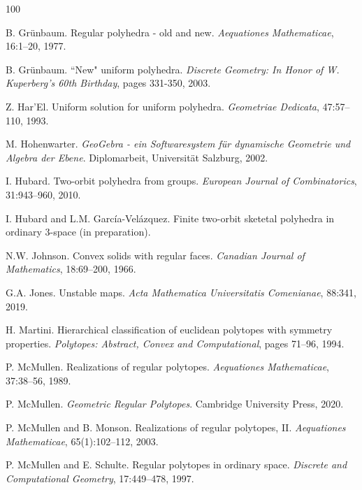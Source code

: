 \documentclass[12pt]{article}
\theoremstyle{definition}\newtheorem{definition}{Definition}[section]
\begin{document}
\begin{thebibliography}{100}

    B. Grünbaum. Regular polyhedra - old and new. \textit{Aequationes Mathematicae}, 16:1–20, 1977.

    
    B. Grünbaum. ``New" uniform polyhedra. \textit{Discrete Geometry: In Honor of W. Kuperberg's 60th Birthday}, pages 331-350, 2003.

    Z. Har’El. Uniform solution for uniform polyhedra. \textit{Geometriae Dedicata}, 47:57–110, 1993.

    M. Hohenwarter. \textit{GeoGebra - ein Softwaresystem für dynamische Geometrie und Algebra der Ebene}. Diplomarbeit, Universität Salzburg, 2002.

    I. Hubard. Two-orbit polyhedra from groups. \textit{ European Journal of Combinatorics}, 31:943--960, 2010.

    I. Hubard and L.M. García-Velázquez. Finite two-orbit sketetal polyhedra in ordinary 3-space (in preparation).

    N.W. Johnson. Convex solids with regular faces. \textit{Canadian Journal of Mathematics}, 18:69–200, 1966.

    G.A. Jones. Unstable maps. \textit{Acta Mathematica Universitatis Comenianae}, 88:341, 2019.

    H. Martini. Hierarchical classification of euclidean polytopes with symmetry properties. \textit{Polytopes: Abstract, Convex and Computational}, pages 71–96, 1994.

    P. McMullen. Realizations of regular polytopes. \textit{Aequationes Mathematicae}, 37:38–56, 1989.

    P. McMullen. \textit{Geometric Regular Polytopes}. Cambridge University Press, 2020.

    P. McMullen and B. Monson. Realizations of regular polytopes, II. \textit{Aequationes Mathematicae}, 65(1):102–112, 2003.

    P. McMullen and E. Schulte. Regular polytopes in ordinary space. \textit{Discrete and Computational Geometry}, 17:449–478, 1997.


\end{thebibliography}
\end{document}
